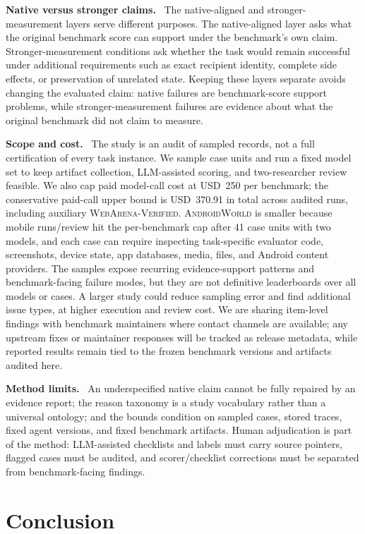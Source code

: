 \documentclass{article}
\newcommand{\webarena}{\textsc{WebArena-Verified}\xspace}
\newcommand{\androidworld}{\textsc{AndroidWorld}\xspace}
\newcommand{\runin}[1]{\noindent\textbf{#1}\ }
\begin{document}
\runin{Native versus stronger claims.}
The native-aligned and stronger-measurement layers serve different purposes.
The native-aligned layer asks what the original benchmark score can support
under the benchmark's own claim. Stronger-measurement
conditions ask whether the task would remain successful under additional
requirements such as exact recipient identity, complete side effects, or
preservation of unrelated state. Keeping
these layers separate avoids changing the evaluated claim: native failures are
benchmark-score support problems, while stronger-measurement failures are
evidence about what the original benchmark did not claim to measure.

\runin{Scope and cost.}
The study is an audit of sampled records, not a full certification of every
task instance. We sample case units and run a fixed model set to keep artifact
collection, LLM-assisted scoring, and
two-researcher review feasible. We also cap paid model-call cost at USD~250 per
benchmark; the conservative paid-call upper bound is USD~370.91 in
total across audited runs, including auxiliary \webarena.
\androidworld is smaller because mobile runs/review hit the per-benchmark cap
after 41 case units with two models, and each case can require inspecting
task-specific evaluator code, screenshots, device state, app databases, media,
files, and Android content providers. The samples expose
recurring evidence-support patterns and benchmark-facing failure modes, but
they are not definitive leaderboards over all models or cases. A larger study
could reduce sampling error and find additional issue types, at
higher execution and review cost. We are sharing item-level
findings with benchmark maintainers where contact channels are available; any
upstream fixes or maintainer responses will be tracked as release metadata,
while reported results remain tied to the frozen benchmark versions and
artifacts audited here.

\runin{Method limits.}
An underspecified native claim cannot be fully repaired by an evidence report; the reason
taxonomy is a study vocabulary rather than a universal ontology; and the bounds
condition on sampled cases, stored traces, fixed agent versions, and fixed
benchmark artifacts. Human adjudication is part of the method: LLM-assisted
checklists and labels must carry source pointers, flagged cases must be audited,
and scorer/checklist corrections must be separated from benchmark-facing
findings.

\section{Conclusion}
\end{document}
